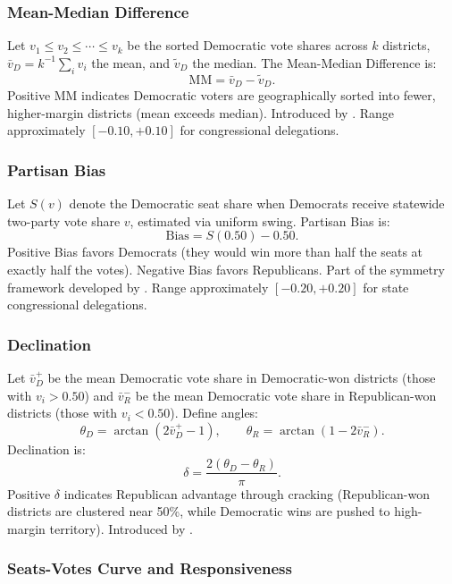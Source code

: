 \subsubsection{Mean-Median Difference}

Let $v_1 \leq v_2 \leq \cdots \leq v_k$ be the sorted Democratic vote shares across
$k$ districts, $\bar{v}_D = k^{-1}\sum_i v_i$ the mean, and $\tilde{v}_D$ the median.
The Mean-Median Difference is:
\[
\text{MM} = \bar{v}_D - \tilde{v}_D.
\]
Positive MM indicates Democratic voters are geographically sorted into fewer,
higher-margin districts (mean exceeds median). Introduced by \citet{wang2016}.
Range approximately $[-0.10, +0.10]$ for congressional delegations.

\subsubsection{Partisan Bias}

Let $S(v)$ denote the Democratic seat share when Democrats receive statewide
two-party vote share $v$, estimated via uniform swing. Partisan Bias is:
\[
\text{Bias} = S(0.50) - 0.50.
\]
Positive Bias favors Democrats (they would win more than half the seats at exactly
half the votes). Negative Bias favors Republicans. Part of the symmetry framework
developed by \citet{grofmanKing2007}. Range approximately $[-0.20, +0.20]$ for
state congressional delegations.

\subsubsection{Declination}

Let $\bar{v}_D^+$ be the mean Democratic vote share in Democratic-won districts
(those with $v_i > 0.50$) and $\bar{v}_R^-$ be the mean Democratic vote share in
Republican-won districts (those with $v_i < 0.50$). Define angles:
\[
\theta_D = \arctan(2\bar{v}_D^+ - 1), \qquad \theta_R = \arctan(1 - 2\bar{v}_R^-).
\]
Declination is:
\[
\delta = \frac{2(\theta_D - \theta_R)}{\pi}.
\]
Positive $\delta$ indicates Republican advantage through cracking (Republican-won
districts are clustered near 50\%, while Democratic wins are pushed to high-margin
territory). Introduced by \citet{warrington2018}.

\subsubsection{Seats-Votes Curve and Responsiveness}

